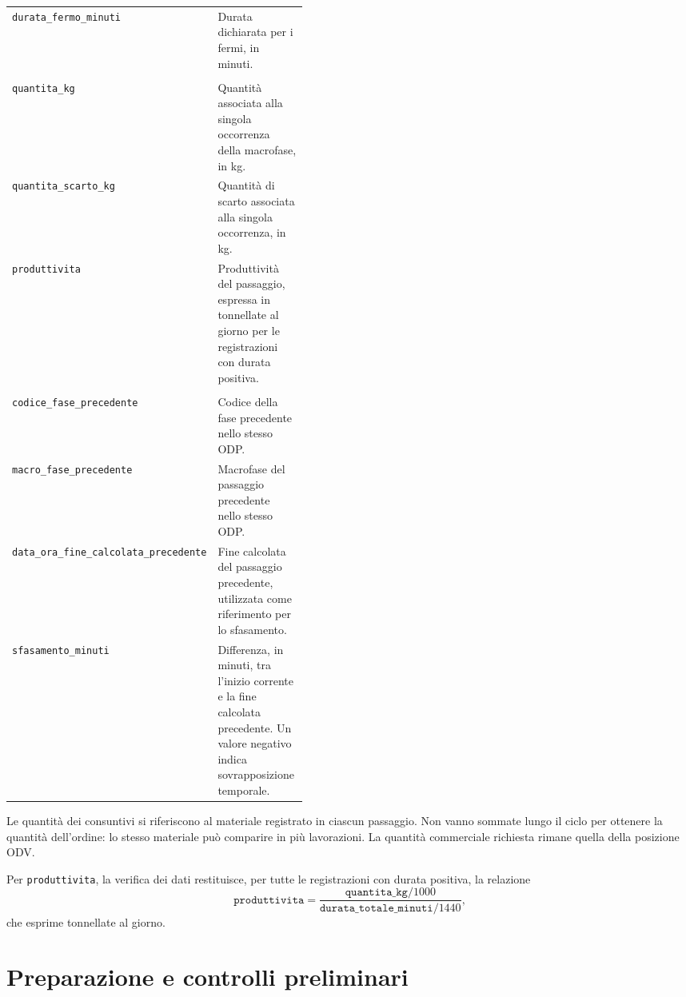\begin{longtable}{@{}p{0.43\linewidth}p{}@{}}
\texttt{durata\_fermo\_minuti} & Durata dichiarata per i fermi, in minuti. \\
\addlinespace[5pt]
\multicolumn{2}{@{}l}{\small\bfseries\color{ReportBlue} Quantità e produttività}\\*
\addlinespace[2pt]
\texttt{quantita\_kg} & Quantità associata alla singola occorrenza della macrofase, in kg. \\
\texttt{quantita\_scarto\_kg} & Quantità di scarto associata alla singola occorrenza, in kg. \\
\texttt{produttivita} & Produttività del passaggio, espressa in tonnellate al giorno per le registrazioni con durata positiva. \\
\addlinespace[5pt]
\multicolumn{2}{@{}l}{\small\bfseries\color{ReportBlue} Riferimenti al passaggio precedente}\\*
\addlinespace[2pt]
\texttt{codice\_fase\_precedente} & Codice della fase precedente nello stesso ODP. \\
\texttt{macro\_fase\_precedente} & Macrofase del passaggio precedente nello stesso ODP. \\
\texttt{data\_ora\_fine\_calcolata\_precedente} & Fine calcolata del passaggio precedente, utilizzata come riferimento per lo sfasamento. \\
\texttt{sfasamento\_minuti} & Differenza, in minuti, tra l'inizio corrente e la fine calcolata precedente. Un valore negativo indica sovrapposizione temporale. \\
\end{longtable}
\endgroup

Le quantità dei consuntivi si riferiscono al materiale registrato in ciascun passaggio. Non vanno sommate lungo il ciclo per ottenere la quantità dell'ordine: lo stesso materiale può comparire in più lavorazioni. La quantità commerciale richiesta rimane quella della posizione ODV.

Per \texttt{produttivita}, la verifica dei dati restituisce, per tutte le registrazioni con durata positiva, la relazione
\begin{equation}
\label{eq:productivity}
\texttt{produttivita}
=\frac{\texttt{quantita\_kg}/1000}{\texttt{durata\_totale\_minuti}/1440},
\end{equation}
che esprime tonnellate al giorno.

\section{Preparazione e controlli preliminari}
\label{sec:preliminary-data-preparation}


